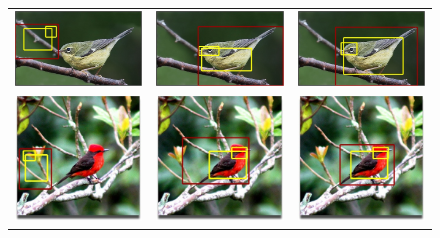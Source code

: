 \begin{figure}
\begin{center}
\begin{tabular}{ccc}
\includegraphics[width=0.3\linewidth]{13_strong_dpm.jpg} &
\includegraphics[width=0.3\linewidth]{13_individual.jpg} &
\includegraphics[width=0.3\linewidth]{13_neighbor.jpg} \\
\includegraphics[trim=0mm 20mm 0mm 20mm, clip, width=0.3\linewidth]{15_strong_dpm.jpg} &
\includegraphics[trim=0mm 20mm 0mm 20mm, clip, width=0.3\linewidth]{15_individual.jpg} &
\includegraphics[trim=0mm 20mm 0mm 20mm, clip, width=0.3\linewidth]{15_neighbor.jpg} \\

\end{tabular}
\end{center}
\end{figure}
